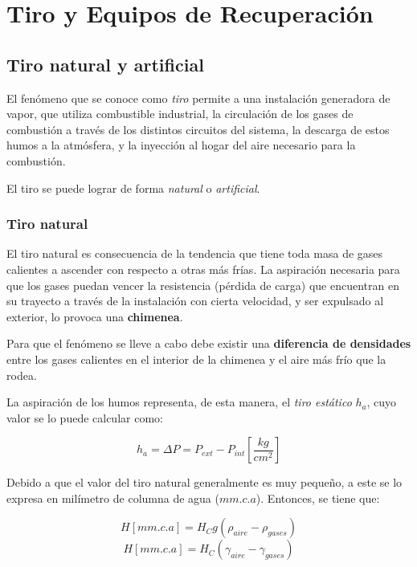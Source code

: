 \section{Tiro y Equipos de Recuperación}

\subsection{Tiro natural y artificial}

El fenómeno que se conoce como \emph{tiro} permite a una instalación generadora de vapor, que utiliza combustible industrial, la circulación de los gases de combustión a través de los distintos circuitos del sistema, la descarga de estos humos a la atmósfera, y la inyección al hogar del aire necesario para la combustión.

El tiro se puede lograr de forma \emph{natural} o \emph{artificial}.

\subsubsection{Tiro natural}

El tiro natural es consecuencia de la tendencia que tiene toda masa de gases calientes a ascender con respecto a otras más frías. La aspiración necesaria para que los gases puedan vencer la resistencia (pérdida de carga) que encuentran en su trayecto a través de la instalación con cierta velocidad, y ser expulsado al exterior, lo provoca una \textbf{chimenea}.


Para que el fenómeno se lleve a cabo debe existir una \textbf{diferencia de densidades} entre los gases calientes en el interior de la chimenea y el aire más frío que la rodea. 

La aspiración de los humos representa, de esta manera, el \emph{tiro estático} $h_a$, cuyo valor se lo puede calcular como:

\begin{equation*}
	h_a = \Delta P = P_{ext} - P_{int} \left[\dfrac{kg}{cm^2}\right]
\end{equation*}


Debido a que el valor del tiro natural generalmente es muy pequeño, a este se lo expresa en milímetro de columna de agua ($mm.c.a$). Entonces, se tiene que:

\begin{equation*}
	H[mm.c.a] = H_C g (\rho_{aire} - \rho_{gases})
\end{equation*}
\begin{equation}
	H[mm.c.a] = H_C (\gamma_{aire} - \gamma_{gases})
\end{equation}


